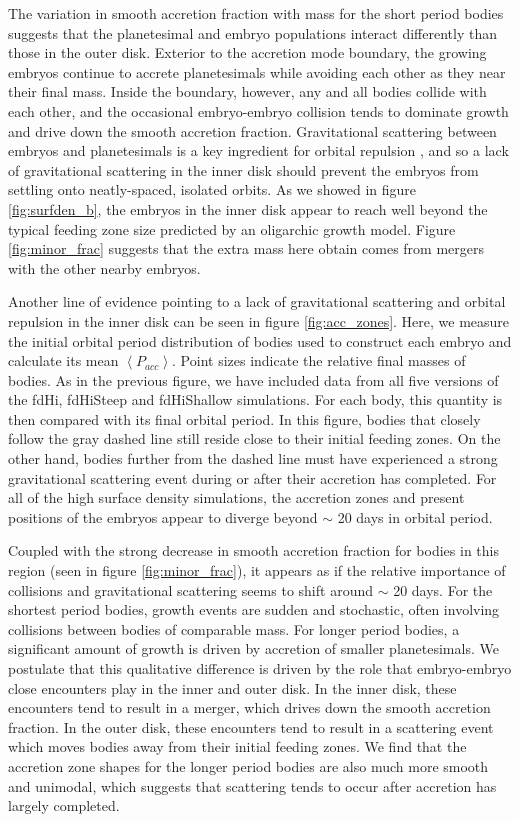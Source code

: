 \documentclass[twocolumn,linenumbers]{aastex63}
\begin{document}
The variation in smooth accretion fraction with mass for the short period bodies suggests that the planetesimal and embryo populations interact differently than those in the outer disk. Exterior to the accretion mode boundary, the growing embryos continue to accrete planetesimals while avoiding each other as they near their final mass. Inside the boundary, however, any and all bodies collide with each other, and the occasional embryo-embryo collision tends to dominate growth and drive down the smooth accretion fraction. Gravitational scattering between embryos and planetesimals is a key ingredient for orbital repulsion \citep{kokubo98}, and so a lack of gravitational scattering in the inner disk should prevent the embryos from settling onto neatly-spaced, isolated orbits. As we showed in figure \ref{fig:surfden_b}, the embryos in the inner disk appear to reach well beyond the typical feeding zone size predicted by an oligarchic growth model. Figure \ref{fig:minor_frac} suggests that the extra mass here obtain comes from mergers with the other nearby embryos.

Another line of evidence pointing to a lack of gravitational
scattering and orbital repulsion in the inner disk can be seen in
figure \ref{fig:acc_zones}. Here, we measure the initial orbital period distribution of bodies used to construct each embryo and calculate its mean $\left<  P_{acc} \right>$. Point sizes indicate the relative final masses of bodies. As in the previous figure, we have included data from all five versions of the fdHi, fdHiSteep and fdHiShallow simulations. For each body, this quantity is then compared with its final orbital period. In this figure, bodies that closely follow the gray dashed line still reside close to their initial feeding zones. On the other hand, bodies further from the dashed line must have experienced a strong gravitational scattering event during or after their accretion has completed. For all of the high surface density simulations, the accretion zones and present positions of the embryos appear to diverge beyond $\sim$ 20 days in orbital period.

Coupled with the strong decrease in smooth accretion fraction for bodies in this region (seen in figure \ref{fig:minor_frac}), it appears as if the relative importance of collisions and gravitational scattering seems to shift around $\sim$ 20 days. For the shortest period bodies, growth events are sudden and stochastic, often involving collisions between bodies of comparable mass. For longer period bodies, a significant amount of growth is driven by accretion of smaller planetesimals. We postulate that this qualitative difference is driven by the role that embryo-embryo close encounters play in the inner and outer disk. In the inner disk, these encounters tend to result in a merger, which drives down the smooth accretion fraction. In the outer disk, these encounters tend to result in a scattering event which moves bodies away from their initial feeding zones. We find that the accretion zone shapes for the longer period bodies are also much more smooth and unimodal, which suggests that scattering tends to occur after accretion has largely completed.
\end{document}

